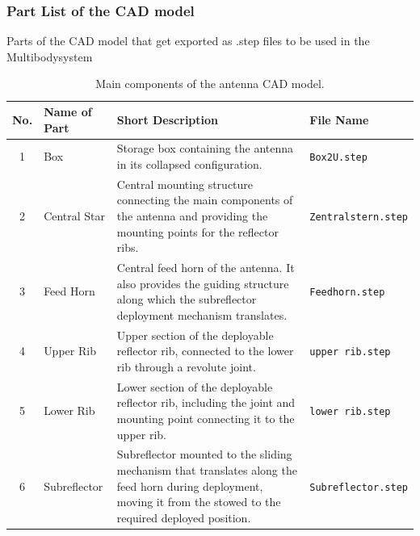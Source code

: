 	\subsubsection {Part List of the CAD model}
	Parts of the CAD model that get exported as .step files to be used in the Multibodysystem
	\begin{table}[htbp]
		\centering
		\caption{Main components of the antenna CAD model.}
		\label{tab:cad_components}
		\small
		
		\begin{tabularx}{\textwidth}{|c|l|X|p{3.2cm}|}
			\hline
			\textbf{No.} & \textbf{Name of Part} & 
			\textbf{Short Description} & \textbf{File Name} \\
			\hline
			
			1 & Box &
			Storage box containing the antenna in its collapsed configuration. &
			\texttt{Box2U.step} \\
			\hline
			
			2 & Central Star &
			Central mounting structure connecting the main components of the antenna and providing the mounting points for the reflector ribs. &
			\texttt{Zentralstern.step} \\
			\hline
			
			3 & Feed Horn &
			Central feed horn of the antenna. It also provides the guiding structure along which the subreflector deployment mechanism translates. &
			\texttt{Feedhorn.step} \\
			\hline
			
			4 & Upper Rib &
			Upper section of the deployable reflector rib, connected to the lower rib through a revolute joint. &
			\texttt{upper rib.step} \\
			\hline
			
			5 & Lower Rib &
			Lower section of the deployable reflector rib, including the joint and mounting point connecting it to the upper rib. &
			\texttt{lower rib.step} \\
			\hline
			
			6 & Subreflector &
			Subreflector mounted to the sliding mechanism that translates along the feed horn during deployment, moving it from the stowed to the required deployed position. &
			\texttt{Subreflector.step} \\
			\hline
			
			
		\end{tabularx}
	\end{table}
	\newpage